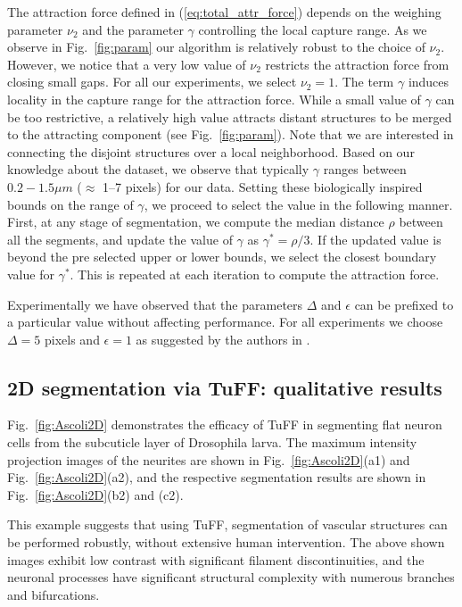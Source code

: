 The attraction force defined in (\ref{eq:total_attr_force}) depends on the weighing parameter $\nu_2$ and the parameter $\gamma$ controlling the local capture range. As we observe in Fig.~\ref{fig:param} our algorithm is relatively robust to the choice of $\nu_2$. However, we notice that a very low value of $\nu_2$ restricts the attraction force from closing small gaps. For all our experiments, we select $\nu_2=1$.  The term $\gamma$ induces locality in the capture range for the attraction force. While a small value of $\gamma$ can be too restrictive, a relatively high value attracts distant structures to be merged to the attracting component (see Fig.~\ref{fig:param}).  Note that we are interested in connecting the disjoint structures over a local neighborhood. Based on our knowledge about the dataset, we observe that typically $\gamma$ ranges between $0.2-1.5\mu m$ ($\approx$ 1--7 pixels) for our data. Setting these biologically inspired bounds on the range of $\gamma$, we proceed to select the value in the following manner. First, at any stage of segmentation, we compute the median distance $\rho$ between all the segments, and update the value of $\gamma$ as $\gamma^*=\mathcal{\rho}/3$. If the updated value is beyond the pre selected upper or lower bounds, we select the closest boundary value for $\gamma^*$. This is repeated at each iteration to compute the attraction  force.

Experimentally we have observed that the parameters $\Delta$ and $\epsilon$ can be prefixed to a particular value without affecting performance. For all experiments we choose $\Delta=5$ pixels and $\epsilon=1$ as suggested by the authors in \cite{chan_vese}.

\subsection{2D segmentation via TuFF: qualitative results}
Fig.~\ref{fig:Ascoli2D} demonstrates the efficacy of TuFF in segmenting flat neuron cells from the subcuticle layer of Drosophila larva. The maximum intensity projection images of the neurites are shown in Fig.~\ref{fig:Ascoli2D}(a1) and Fig.~\ref{fig:Ascoli2D}(a2), and the respective segmentation results are shown in Fig.~\ref{fig:Ascoli2D}(b2) and (c2). 

This example suggests that using TuFF, segmentation of vascular structures can be performed robustly, without extensive human intervention. The above shown images exhibit low contrast with significant filament discontinuities, and the neuronal processes have significant structural complexity with numerous branches and bifurcations. 

